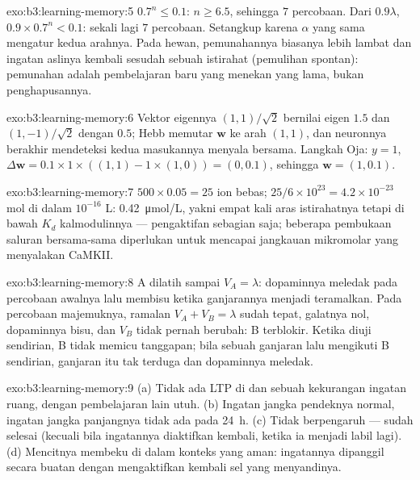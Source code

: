 \begin{solution}{exo:b3:learning-memory:5}
$0.7^{n} \le 0.1$: $n \ge 6.5$, sehingga $7$ percobaan. Dari $0.9\lambda$,
$0.9\times 0.7^{n} < 0.1$: sekali lagi $7$ percobaan. Setangkup karena $\alpha$ yang
sama mengatur kedua arahnya. Pada hewan, pemunahannya biasanya
lebih lambat dan ingatan aslinya kembali sesudah sebuah istirahat (pemulihan
spontan): pemunahan adalah pembelajaran baru yang menekan yang lama, bukan penghapusannya.
\end{solution}

\begin{solution}{exo:b3:learning-memory:6}
Vektor eigennya $(1,1)/\sqrt{2}$ bernilai eigen $1.5$ dan $(1,-1)/\sqrt{2}$
dengan $0.5$; Hebb memutar $\mathbf{w}$ ke arah $(1,1)$, dan neuronnya berakhir
mendeteksi kedua masukannya menyala bersama. Langkah Oja: $y = 1$,
$\Delta\mathbf{w} = 0.1\times 1\times((1,1) - 1\times(1,0)) = (0,0.1)$,
sehingga $\mathbf{w} = (1, 0.1)$.
\end{solution}

\begin{solution}{exo:b3:learning-memory:7}
$500\times 0.05 = 25$ ion bebas; $25/6\times 10^{23} = 4.2\times 10^{-23}$
mol di dalam $10^{-16}$ L: \qty{0.42}{\micro mol/L}, yakni empat kali aras
istirahatnya tetapi di bawah $K_{d}$ kalmodulinnya --- pengaktifan sebagian saja;
beberapa pembukaan saluran bersama-sama diperlukan untuk mencapai jangkauan mikromolar
yang menyalakan CaMKII.
\end{solution}

\begin{solution}{exo:b3:learning-memory:8}
A dilatih sampai $V_{A} = \lambda$: dopaminnya meledak pada percobaan
awalnya lalu membisu ketika ganjarannya menjadi teramalkan. Pada percobaan
majemuknya, ramalan $V_{A} + V_{B} = \lambda$ sudah tepat,
galatnya nol, dopaminnya bisu, dan $V_{B}$ tidak pernah berubah: B
terblokir. Ketika diuji sendirian, B tidak memicu tanggapan; bila sebuah ganjaran lalu mengikuti B
sendirian, ganjaran itu tak terduga dan dopaminnya meledak.
\end{solution}

\begin{solution}{exo:b3:learning-memory:9}
(a) Tidak ada LTP di  dan sebuah kekurangan ingatan ruang, dengan pembelajaran lain
utuh. (b) Ingatan jangka pendeknya normal, ingatan jangka panjangnya tidak ada pada
\qty{24}{h}. (c) Tidak berpengaruh ---  sudah selesai (kecuali bila ingatannya
diaktifkan kembali, ketika ia menjadi labil lagi). (d) Mencitnya membeku di dalam
konteks yang aman: ingatannya dipanggil secara buatan dengan mengaktifkan kembali
sel yang menyandinya.
\end{solution}

